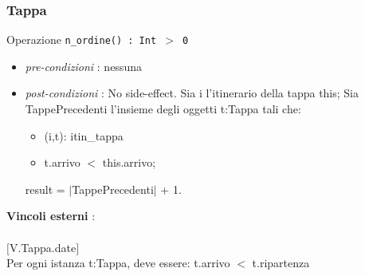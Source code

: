 \documentclass[12pt, letterpaper]{article}
\newcommand{\acc}{\\\hphantom{}\\}
\newcommand{\code}[1]{\colorbox{light-gray}{\texttt{#1}}}
\begin{document}
\subsubsection{Tappa}
Operazione \code{n\_ordine() : Int $>$ 0}\begin{itemize}
    \item \textit{pre-condizioni} : nessuna
    \item \textit{post-condizioni} : No side-effect.
          Sia i l'itinerario della tappa this;
          Sia TappePrecedenti l'insieme degli oggetti t:Tappa tali che:\begin{itemize}
              \item  (i,t): itin\_tappa\\
              \item  t.arrivo $<$ this.arrivo;\end{itemize}
          result = $|$TappePrecedenti$|$ + 1.
\end{itemize}
\textbf{Vincoli esterni} :\acc
$[$V.Tappa.date$]$\\
\hphantom{ident}Per ogni istanza t:Tappa, deve essere:
t.arrivo $<$ t.ripartenza
\end{document}

